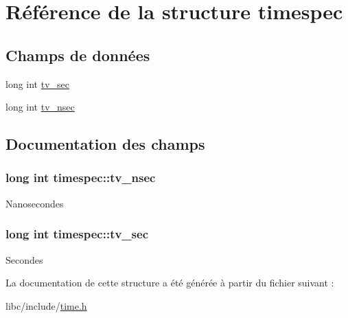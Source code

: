 \hypertarget{structtimespec}{\section{\-Référence de la structure timespec}
\label{structtimespec}
}
\subsection*{\-Champs de données}
\begin{DoxyCompactItemize}
\item 
long int \hyperlink{structtimespec_af632894a12c37dea87073c0126f99fff}{tv\-\_\-sec}
\item 
long int \hyperlink{structtimespec_aa9689622a344d847333e534ac23d3093}{tv\-\_\-nsec}
\end{DoxyCompactItemize}


\subsection{\-Documentation des champs}
\hypertarget{structtimespec_aa9689622a344d847333e534ac23d3093}{
\subsubsection[{tv\-\_\-nsec}]{\setlength{\rightskip}{0pt plus 5cm}long int {\bf timespec\-::tv\-\_\-nsec}}}\label{structtimespec_aa9689622a344d847333e534ac23d3093}
\-Nanosecondes \hypertarget{structtimespec_af632894a12c37dea87073c0126f99fff}{
\subsubsection[{tv\-\_\-sec}]{\setlength{\rightskip}{0pt plus 5cm}long int {\bf timespec\-::tv\-\_\-sec}}}\label{structtimespec_af632894a12c37dea87073c0126f99fff}
\-Secondes 

\-La documentation de cette structure a été générée à partir du fichier suivant \-:\begin{DoxyCompactItemize}
\item 
libc/include/\hyperlink{time_8h}{time.\-h}\end{DoxyCompactItemize}
